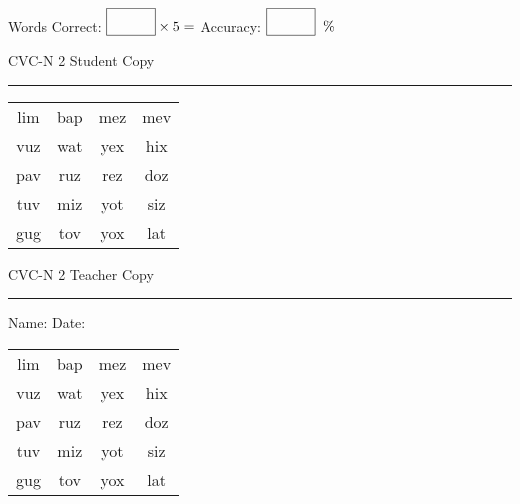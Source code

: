 \documentclass{memoir}
\begin{document}
\small

Words Correct: $\fbox{\phantom{\huge 100}} \times 5 = $ Accuracy: $\fbox{\phantom{\huge 100}}\;\; \%$ 

\vfill

\newpage


\footnotesize \noindent
CVC-N 2 \hfill Student Copy
\smallskip
\hrule

\Large

\setlength{\tabcolsep}{14pt}
\def\arraystretch{2}

{\selectfont


\begin{vplace}[0.5]
\begin{center}
\begin{tabular}{cccc}
lim & bap & mez & mev \\
vuz & wat & yex & hix \\
pav & ruz & rez & doz \\
tuv & miz & yot & siz \\
gug & tov & yox & lat \\
\end{tabular}
\end{center}
\end{vplace}

}

\newpage

\footnotesize \noindent
CVC-N 2 \hfill Teacher Copy
\smallskip
\hrule

\small

\vfill

\noindent
Name: \underline{\hspace{1.75in}} \hfill Date: \underline{\hspace{1in}}

\Large

{\selectfont


\begin{vplace}[0.5]
\begin{center}
\begin{tabular}{cccc}
lim & bap & mez & mev \\
vuz & wat & yex & hix \\
pav & ruz & rez & doz \\
tuv & miz & yot & siz \\
gug & tov & yox & lat \\
\end{tabular}
\end{center}
\end{vplace}



}
\end{document}

